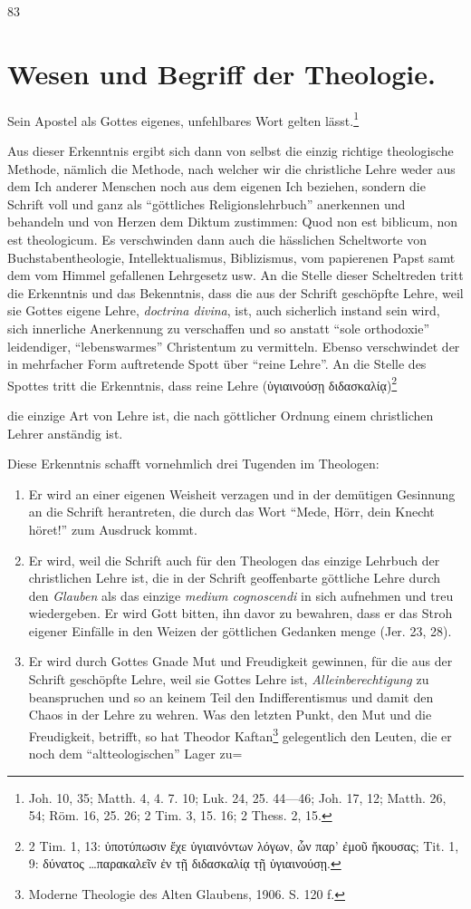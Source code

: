 {\hfill 83\par}\section*{Wesen und Begriff der Theologie.}\par{}Sein Apostel als Gottes eigenes, unfehlbares Wort gelten lässt.\footnote{Joh. 10, 35; Matth. 4, 4. 7. 10; Luk. 24, 25. 44—46; Joh. 17, 12; Matth. 26, 54; Röm. 16, 25. 26; 2 Tim. 3, 15. 16; 2 Thess. 2, 15.}\par{}Aus dieser Erkenntnis ergibt sich dann von selbst die einzig richtige theologische Methode, nämlich die Methode, nach welcher wir die christliche Lehre weder aus dem Ich anderer Menschen noch aus dem eigenen Ich beziehen, sondern die Schrift voll und ganz als \textquotedblleft göttliches Religionslehrbuch\textquotedblright{} anerkennen und behandeln und von Herzen dem Diktum zustimmen: Quod non est biblicum, non est theologicum. Es verschwinden dann auch die hässlichen Scheltworte von Buchstabentheologie, Intellektualismus, Biblizismus, vom papierenen Papst samt dem vom Himmel gefallenen Lehrgesetz usw. An die Stelle dieser Scheltreden tritt die Erkenntnis und das Bekenntnis, dass die aus der Schrift geschöpfte Lehre, weil sie Gottes eigene Lehre, \textit{doctrina divina}, ist, auch sicherlich instand sein wird, sich innerliche Anerkennung zu verschaffen und so anstatt \textquotedblleft sole orthodoxie\textquotedblright{} leidendiger, \textquotedblleft lebenswarmes\textquotedblright{} Christentum zu vermitteln. Ebenso verschwindet der in mehrfacher Form auftretende Spott über \textquotedblleft reine Lehre\textquotedblright{}. An die Stelle des Spottes tritt die Erkenntnis, dass reine Lehre (\textgreek{ὑγιαινούσῃ διδασκαλίᾳ})\footnote{2 Tim. 1, 13: \textgreek{ὑποτύπωσιν ἔχε ὑγιαινόντων λόγων, ὧν παρ’ ἐμοῦ ἤκουσας}; Tit. 1, 9: \textgreek{δύνατος \ldots παρακαλεῖν ἐν τῇ διδασκαλίᾳ τῇ ὑγιαινούσῃ}.}\par{}die einzige Art von Lehre ist, die nach göttlicher Ordnung einem christlichen Lehrer anständig ist.\par{}Diese Erkenntnis schafft vornehmlich drei Tugenden im Theologen:\begin{enumerate}\item Er wird an einer eigenen Weisheit verzagen und in der demütigen Gesinnung an die Schrift herantreten, die durch das Wort \textquotedblleft Mede, Hörr, dein Knecht höret!\textquotedblright{} zum Ausdruck kommt.\item Er wird, weil die Schrift auch für den Theologen das einzige Lehrbuch der christlichen Lehre ist, die in der Schrift geoffenbarte göttliche Lehre durch den \textit{Glauben} als das einzige \textit{medium cognoscendi} in sich aufnehmen und treu wiedergeben. Er wird Gott bitten, ihn davor zu bewahren, dass er das Stroh eigener Einfälle in den Weizen der göttlichen Gedanken menge (Jer. 23, 28).\item Er wird durch Gottes Gnade Mut und Freudigkeit gewinnen, für die aus der Schrift geschöpfte Lehre, weil sie Gottes Lehre ist, \textit{Alleinberechtigung} zu beanspruchen und so an keinem Teil den Indifferentismus und damit den Chaos in der Lehre zu wehren. Was den letzten Punkt, den Mut und die Freudigkeit, betrifft, so hat Theodor Kaftan\footnote{Moderne Theologie des Alten Glaubens, 1906. S. 120 f.} gelegentlich den Leuten, die er noch dem \textquotedblleft altteologischen\textquotedblright{} Lager zu=\end{enumerate}